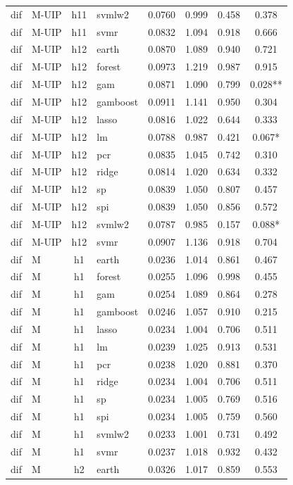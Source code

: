 \begin{ThreePartTable}
\begin{longtable}[t]{llclcccc}
dif & M-UIP & h11 & svmlw2 & 0.0760 & 0.999 & 0.458 & 0.378\\
dif & M-UIP & h11 & svmr & 0.0832 & 1.094 & 0.918 & 0.666\\
\addlinespace
dif & M-UIP & h12 & earth & 0.0870 & 1.089 & 0.940 & 0.721\\
dif & M-UIP & h12 & forest & 0.0973 & 1.219 & 0.987 & 0.915\\
dif & M-UIP & h12 & gam & 0.0871 & 1.090 & 0.799 & 0.028**\\
dif & M-UIP & h12 & gamboost & 0.0911 & 1.141 & 0.950 & 0.304\\
dif & M-UIP & h12 & lasso & 0.0816 & 1.022 & 0.644 & 0.333\\
dif & M-UIP & h12 & lm & 0.0788 & 0.987 & 0.421 & 0.067*\\
dif & M-UIP & h12 & pcr & 0.0835 & 1.045 & 0.742 & 0.310\\
dif & M-UIP & h12 & ridge & 0.0814 & 1.020 & 0.634 & 0.332\\
dif & M-UIP & h12 & sp & 0.0839 & 1.050 & 0.807 & 0.457\\
dif & M-UIP & h12 & spi & 0.0839 & 1.050 & 0.856 & 0.572\\
dif & M-UIP & h12 & svmlw2 & 0.0787 & 0.985 & 0.157 & 0.088*\\
dif & M-UIP & h12 & svmr & 0.0907 & 1.136 & 0.918 & 0.704\\
\addlinespace
dif & M & h1 & earth & 0.0236 & 1.014 & 0.861 & 0.467\\
dif & M & h1 & forest & 0.0255 & 1.096 & 0.998 & 0.455\\
dif & M & h1 & gam & 0.0254 & 1.089 & 0.864 & 0.278\\
dif & M & h1 & gamboost & 0.0246 & 1.057 & 0.910 & 0.215\\
dif & M & h1 & lasso & 0.0234 & 1.004 & 0.706 & 0.511\\
dif & M & h1 & lm & 0.0239 & 1.025 & 0.913 & 0.531\\
dif & M & h1 & pcr & 0.0238 & 1.020 & 0.881 & 0.370\\
dif & M & h1 & ridge & 0.0234 & 1.004 & 0.706 & 0.511\\
dif & M & h1 & sp & 0.0234 & 1.005 & 0.769 & 0.516\\
dif & M & h1 & spi & 0.0234 & 1.005 & 0.759 & 0.560\\
dif & M & h1 & svmlw2 & 0.0233 & 1.001 & 0.731 & 0.492\\
dif & M & h1 & svmr & 0.0237 & 1.018 & 0.932 & 0.432\\
\addlinespace
dif & M & h2 & earth & 0.0326 & 1.017 & 0.859 & 0.553\\

\end{longtable}
\end{ThreePartTable}
